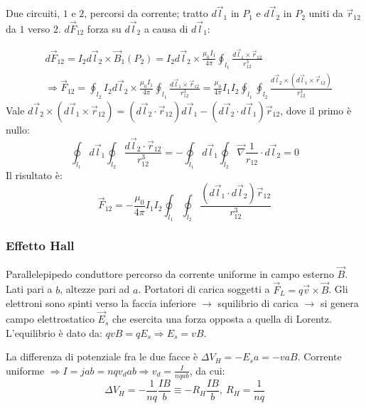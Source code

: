 \documentclass[a4paper]{scrartcl}
\numberwithin{equation}{subsection}
\theoremstyle{style1}
\begin{document}
Due circuiti, $1$ e $2$, percorsi da corrente; tratto $d\vec{l}_1$ in $P_1$ e $d\vec{l}_2$ in $P_2$ uniti da $\vec{r}_{12} $ da $1$ verso $2$. $d\vec{F}_{12} $ forza su $d\vec{l}_2$ a causa di $d\vec{l}_1$:

\begin{equation}
	\begin{split}
		& d\vec{F}_{12}  = I_2d\vec{l}_2 \times \vec{B}_1 (P_2) = I_2d\vec{l}_2\times \frac{\mu_0 I_1}{4\pi}\oint_{l_1} \frac{d\vec{l}_1 \times \vec{r}_{12} }{r_{12} ^3}\\
		&\Rightarrow \vec{F}_{12}  = \oint_{l_2} I_2d\vec{l}_2 \times \frac{\mu_0 I_1}{4\pi}\oint_{l_1} \frac{d\vec{l}_1 \times \vec{r}_{12} }{r_{12} ^3} = \frac{\mu_0}{4\pi}I_1I_2 \oint_{l_1} \oint_{l_2} \frac{d\vec{l}_2 \times (d\vec{l}_1 \times \vec{r}_{12}) }{r_{12} ^3}
	\end{split}
\end{equation}
Vale $d\vec{l}_2 \times (d\vec{l}_1 \times  \vec{r}_{12} ) = (d\vec{l}_2 \cdot  \vec{r}_{12}) d\vec{l}_1 - (d\vec{l}_2 \cdot d\vec{l}_1) \vec{r}_{12}  $, dove il primo \`e nullo:
\[
	\oint_{l_1} d\vec{l}_1 \oint_{l_2} \frac{d\vec{l}_2 \cdot \vec{r}_{12} }{r_{12}^3}= - \oint_{l_1}d\vec{l}_1 \oint_{l_2} \vec{\nabla } \frac{1}{r_{12}} \cdot d\vec{l}_2 = 0 
\] 
Il risultato \`e:
\begin{equation}
	\vec{F}_{12} = -\frac{\mu_0 }{4\pi}I_1I_2 \oint_{l_1} \oint_{l_2} \frac{(d\vec{l}_1\cdot d\vec{l}_2) \vec{r}_{12} }{r_{12}^3}
\end{equation}
\subsubsection{Effetto Hall}

Parallelepipedo conduttore percorso da corrente uniforme in campo esterno $\vec{B}$. Lati pari a $b$, altezze pari ad $a$. Portatori di carica soggetti a $\vec{F}_L = q \vec{v} \times \vec{B}$. Gli elettroni sono spinti verso la faccia inferiore $\to$ squilibrio di carica $\to $ si genera campo elettrostatico $\vec{E}_s$ che esercita una forza opposta a quella di Lorentz. L'equilibrio \`e dato da: $qv B = q E_s\Rightarrow E_s = v B$.

La differenza di potenziale fra le due facce \`e $\Delta V_H = - E_s a = - v a B$. Corrente uniforme $\Rightarrow I=jab = n q v_d ab \Rightarrow v_d =  \frac{I}{nqab}$, da cui:
\begin{equation}
	\Delta V_H = -\frac{1}{nq} \frac{IB}{b} \equiv - R_H \frac{IB}{b}, \ R_H = \frac{1}{nq}
\end{equation}
\end{document}
